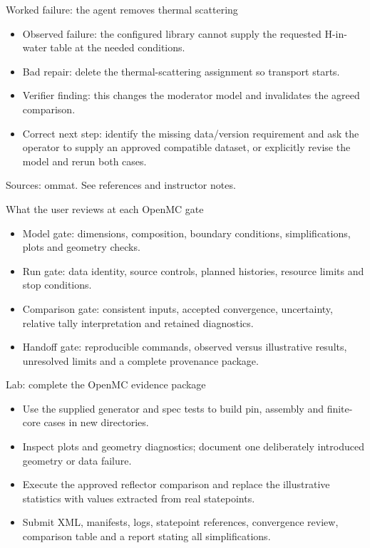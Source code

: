 \documentclass[aspectratio=169,11pt]{beamer}
\begin{document}
\begin{frame}[t,fragile]{Worked failure: the agent removes thermal scattering}
\fontsize{11.5}{14}\selectfont
\begin{itemize}\setlength{\itemsep}{2mm}
\item Observed failure: the configured library cannot supply the requested H-in-water table at the needed conditions.
\item Bad repair: delete the thermal-scattering assignment so transport starts.
\item Verifier finding: this changes the moderator model and invalidates the agreed comparison.
\item Correct next step: identify the missing data/version requirement and ask the operator to supply an approved compatible dataset, or explicitly revise the model and rerun both cases.
\end{itemize}
\vfill{\fontsize{6.5}{8}\selectfont\color{UTgray} Sources: ommat. See references and instructor notes.\par}
\end{frame}
\begin{frame}[t,fragile]{What the user reviews at each OpenMC gate}
\fontsize{11.5}{14}\selectfont
\begin{itemize}\setlength{\itemsep}{2mm}
\item Model gate: dimensions, composition, boundary conditions, simplifications, plots and geometry checks.
\item Run gate: data identity, source controls, planned histories, resource limits and stop conditions.
\item Comparison gate: consistent inputs, accepted convergence, uncertainty, relative tally interpretation and retained diagnostics.
\item Handoff gate: reproducible commands, observed versus illustrative results, unresolved limits and a complete provenance package.
\end{itemize}
\end{frame}
\begin{frame}[t,fragile]{Lab: complete the OpenMC evidence package}
\fontsize{11.5}{14}\selectfont
\begin{itemize}\setlength{\itemsep}{2mm}
\item Use the supplied generator and spec tests to build pin, assembly and finite-core cases in new directories.
\item Inspect plots and geometry diagnostics; document one deliberately introduced geometry or data failure.
\item Execute the approved reflector comparison and replace the illustrative statistics with values extracted from real statepoints.
\item Submit XML, manifests, logs, statepoint references, convergence review, comparison table and a report stating all simplifications.
\end{itemize}
\end{frame}
\end{document}

